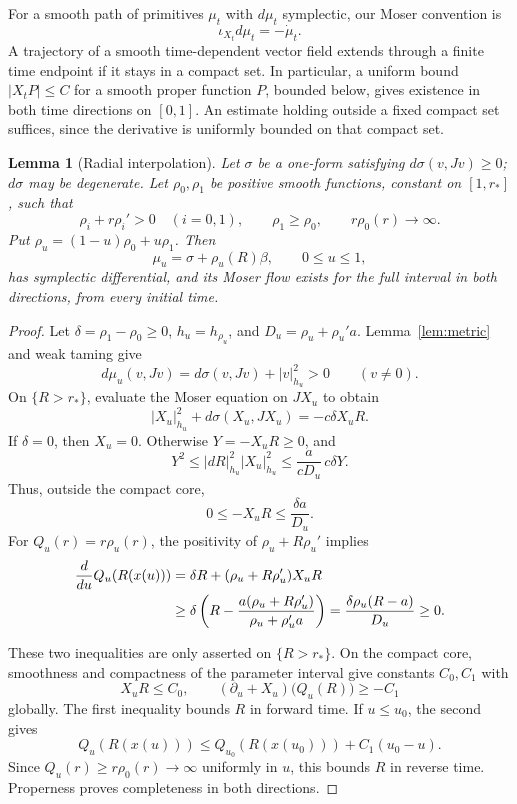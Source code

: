 \documentclass[11pt,a4paper]{article}
\newtheorem{lemma}[theorem]{Lemma}
\theoremstyle{remark}
\newcommand{\abs}[1]{\lvert #1\rvert}
\numberwithin{equation}{section}
\begin{document}
For a smooth path of primitives $\mu_t$ with $d\mu_t$ symplectic, our Moser convention is
\begin{equation}\label{eq:moser}
\iota_{X_t}d\mu_t=-\dot\mu_t.
\end{equation}
A trajectory of a smooth time-dependent vector field extends through a finite time endpoint if it stays in a compact set. In particular, a uniform bound $\abs{X_tP}\le C$ for a smooth proper function $P$, bounded below, gives existence in both time directions on $[0,1]$. An estimate holding outside a fixed compact set suffices, since the derivative is uniformly bounded on that compact set.

\begin{lemma}[Radial interpolation]\label{lem:bridge}
Let $\sigma$ be a one-form satisfying $d\sigma(v,Jv)\ge0$; $d\sigma$ may be degenerate. Let $\rho_0,\rho_1$ be positive smooth functions, constant on $[1,r_*]$, such that
\begin{equation}\label{eq:bridgehyp}
\rho_i+r\rho_i'>0\quad(i=0,1),\qquad
\rho_1\ge\rho_0,\qquad r\rho_0(r)\longrightarrow\infty.
\end{equation}
Put $\rho_u=(1-u)\rho_0+u\rho_1$. Then
\[
\mu_u=\sigma+\rho_u(R)\beta,\qquad 0\le u\le1,
\]
has symplectic differential, and its Moser flow exists for the full interval in both directions, from every initial time.
\end{lemma}

\begin{proof}
Let $\delta=\rho_1-\rho_0\ge0$, $h_u=h_{\rho_u}$, and $D_u=\rho_u+\rho_u'a$. Lemma~\ref{lem:metric} and weak taming give
\[
d\mu_u(v,Jv)=d\sigma(v,Jv)+\abs{v}_{h_u}^2>0\qquad(v\ne0).
\]
On $\{R>r_*\}$, evaluate the Moser equation on $JX_u$ to obtain
\begin{equation}\label{eq:bridgeenergy}
\abs{X_u}_{h_u}^2+d\sigma(X_u,JX_u)=-c\delta X_uR.
\end{equation}
If $\delta=0$, then $X_u=0$. Otherwise $Y=-X_uR\ge0$, and
\[
Y^2\le\abs{dR}_{h_u}^2\abs{X_u}_{h_u}^2
\le\frac{a}{cD_u}\,c\delta Y.
\]
Thus, outside the compact core,
\begin{equation}\label{eq:bridgeradial}
0\le-X_uR\le\frac{\delta a}{D_u}.
\end{equation}
For $Q_u(r)=r\rho_u(r)$, the positivity of $\rho_u+R\rho_u'$ implies
\begin{align}
\frac d{du}Q_u(R(x(u)))
&=\delta R+(\rho_u+R\rho_u')X_uR\notag\\
&\ge\delta\left(R-\frac{a(\rho_u+R\rho_u')}{\rho_u+\rho_u'a}\right)
=\frac{\delta\rho_u(R-a)}{D_u}\ge0.
\label{eq:Qmonotone}
\end{align}

These two inequalities are only asserted on $\{R>r_*\}$. On the compact core, smoothness and compactness of the parameter interval give constants $C_0,C_1$ with
\[
X_uR\le C_0,\qquad
(\partial_u+X_u)\bigl(Q_u(R)\bigr)\ge-C_1
\]
globally. The first inequality bounds $R$ in forward time. If $u\le u_0$, the second gives
\[
Q_u(R(x(u)))\le Q_{u_0}(R(x(u_0)))+C_1(u_0-u).
\]
Since $Q_u(r)\ge r\rho_0(r)\to\infty$ uniformly in $u$, this bounds $R$ in reverse time. Properness proves completeness in both directions.
\end{proof}
\end{document}
